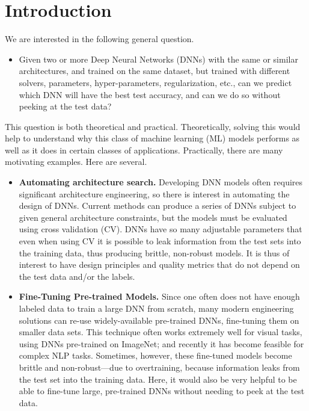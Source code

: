 
\section{Introduction}
\label{sxn:intro}

We are interested in the following general question.
\begin{itemize}
\item
Given two or more Deep Neural Networks (DNNs) with the same or similar architectures, and trained on the same dataset, but trained with different solvers, parameters, hyper-parameters, regularization, etc., can we predict which DNN will have the best test accuracy, and can we do so without peeking at the test data? 
\end{itemize}

This question is both theoretical and practical. 
Theoretically, solving this would help to understand why this class of machine learning (ML) models performs as well as it does in certain classes of applications.
Practically, there are many motivating examples.
% 
Here are several.
\begin{itemize}
\item
\textbf{Automating architecture search.}
Developing DNN models often requires significant architecture engineering, so there is interest in automating the design of DNNs.
Current methods can produce a series of DNNs subject to given general architecture constraints, but the models must be evaluated using cross validation (CV).
DNNs have so many adjustable parameters that even when using CV it is possible to leak information from the test sets into the training data, thus producing brittle, non-robust models.
It is thus of interest to have design principles and quality metrics that do not depend on the test data and/or the labels. 
\item
\textbf{Fine-Tuning Pre-trained Models.}
Since one often does not have enough labeled data to train a large DNN from scratch, many modern engineering solutions can re-use widely-available pre-trained DNNs, fine-tuning them on smaller data sets. 
This technique often works extremely well for visual tasks, using DNNs pre-trained on ImageNet; and recently it has become feasible for complex NLP tasks. 
Sometimes, however, these fine-tuned models become brittle and non-robust---due to overtraining, because information leaks from the test set into the training data.
Here, it would also be very helpful to be able to fine-tune large, pre-trained DNNs without needing to peek at the test data.
\end{itemize}

